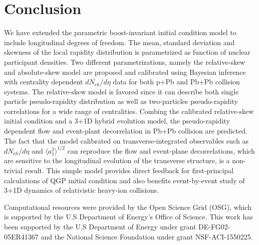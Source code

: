 \documentclass[3p,times,twocolumn]{elsarticle}
\begin{document}
\section{Conclusion}
\label{Conclusion}
We have extended the parametric boost-invariant initial condition model \trento to include longitudinal degrees of freedom.
The mean, standard deviation and skewness of the local rapidity distribution is parametrized as function of nuclear participant densities.
Two different parametrizations, namely the relative-skew and absolute-skew model are proposed and calibrated using Bayesian inference with centrality dependent $dN_{ch}/d\eta$ data for both p+Pb and Pb+Pb collision systems.
The relative-skew model is favored since it can describe both single particle pseudo-rapidity distribution as well as two-particles pseudo-rapidity correlations for a wide range of centralities.
Combing the calibrated relative-skew initial condition and a 3+1D hybrid evolution model, the pseudo-rapidity dependent flow and event-plant decorrelation in Pb+Pb collision are predicted.
The fact that the model calibrated on transverse-integrated observables such as $dN_{ch}/d\eta$ and $\langle a_1^2\rangle^{1/2}$ can reproduce the flow and event-plane decorrelations, which are sensitive to the longitudinal evolution of the transverse structure, is a non-trivial result.
This simple model provides direct feedback for first-principal calculations of QGP initial condition and also benefits event-by-event study of 3+1D dynamics of relativistic heavy-ion collisions. 

Computational resources were provided by the Open Science Grid (OSG), which is supported by the U.S Department of Energy's Office of Science. This work has been supported by the U.S Department of Energy under grant DE-FG02-05ER41367 and the National Science Foundation under grant NSF-ACI-1550225.












\end{document}

